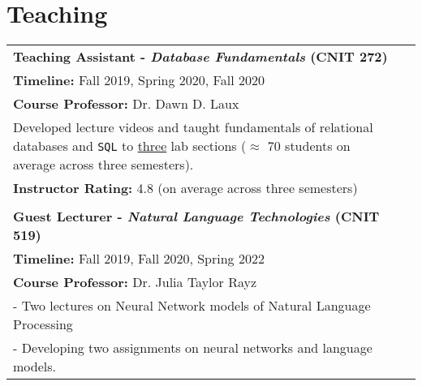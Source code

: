 \documentclass[11pt]{article}
\begin{document}
\section*{Teaching}
\begin{tabularx}{\textwidth}{@{}p{}l}
\large \textbf{Teaching Assistant - \textit{Database Fundamentals} (CNIT 272)}\\
\textbf{Timeline:} Fall 2019, Spring 2020, Fall 2020\\
\textbf{Course Professor:} Dr. Dawn D. Laux\\
Developed lecture videos and taught fundamentals of relational databases and \texttt{SQL} to \underline{three} lab sections ($\approx$ 70 students on average across three semesters).\\
\textbf{Instructor Rating:} 4.8 (on average across three semesters)\\\\

\large \textbf{Guest Lecturer - \textit{Natural Language Technologies} (CNIT 519)}\\
\textbf{Timeline:} Fall 2019, Fall 2020, Spring 2022\\
\textbf{Course Professor:} Dr. Julia Taylor Rayz\\
- Two lectures on Neural Network models of Natural Language Processing\\
- Developing two assignments on neural networks and language models.
\end{tabularx}


\end{document}
